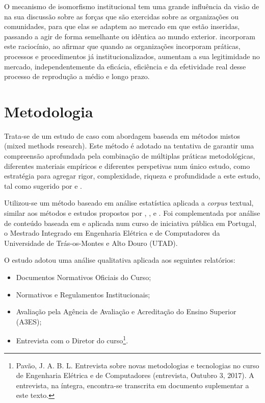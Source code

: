 \documentclass{textolivre-html}
\begin{document}
O mecanismo de isomorfismo institucional tem uma grande influência da visão de \textcite{kanter1972} na sua discussão sobre as forças que são exercidas sobre as organizações ou comunidades, para que elas se adaptem ao mercado em que estão inseridas, passando a agir de forma semelhante ou idêntica ao mundo exterior. \textcite{meyer1977} incorporam este raciocínio, ao afirmar que quando as organizações incorporam práticas, processos e procedimentos já institucionalizados, aumentam a sua legitimidade no mercado, independentemente da eficácia, eficiência e da efetividade real desse processo de reprodução a médio e longo prazo.

\section{Metodologia}\label{sec-metodologia}
Trata-se de um estudo de caso com abordagem baseada em métodos mistos (mixed methods research). Este método é adotado na tentativa de garantir uma compreensão aprofundada pela combinação de múltiplas práticas metodológicas, diferentes materiais empíricos e diferentes perspetivas num único estudo, como estratégia para agregar rigor, complexidade, riqueza e profundidade a este estudo, tal como sugerido por \textcite{denzin2012} e \textcite{denzin2005}.

Utilizou-se um método baseado em análise estatística aplicada a \textit{corpus} textual, similar aos métodos e estudos propostos por \textcite{lebart1994}, \textcite{marchand2012}, \textcite{reinert1983} e \textcite{reinert1990}. Foi complementada por análise de conteúdo baseada em \textcite{bardin1977} e aplicada num curso de iniciativa pública em Portugal, o Mestrado Integrado em Engenharia Elétrica e de Computadores da Universidade de Trás-os-Montes e Alto Douro (UTAD).

O estudo adotou uma análise qualitativa aplicada aos seguintes relatórios:

\begin{itemize}
\item Documentos Normativos Oficiais do Curso;
\item Normativos e Regulamentos Institucionais;
\item Avaliação pela Agência de Avaliação e Acreditação do Ensino Superior (A3ES);
\item Entrevista com o Diretor do curso\footnote{Pavão, J. A. B. L. Entrevista sobre novas metodologias e tecnologias no curso de Engenharia Elétrica e de Computadores (entrevista, Outubro 3, 2017). A entrevista, na íntegra, encontra-se transcrita em documento suplementar a este texto.}.
\end{itemize}
\end{document}
